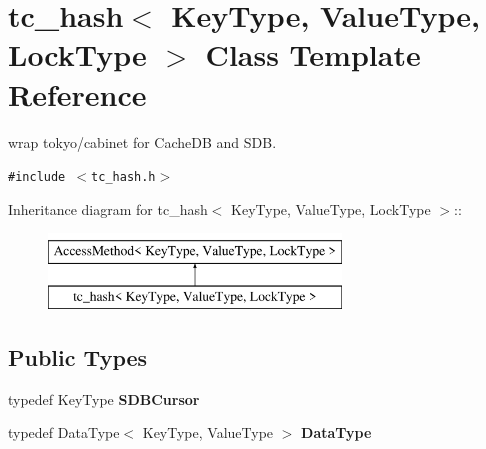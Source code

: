 \hypertarget{classtc__hash}{
\section{tc\_\-hash$<$ KeyType, ValueType, LockType $>$ Class Template Reference}
\label{classtc__hash}
}
wrap tokyo/cabinet for CacheDB and SDB.  


{\tt \#include $<$tc\_\-hash.h$>$}

Inheritance diagram for tc\_\-hash$<$ KeyType, ValueType, LockType $>$::\begin{figure}[H]
\begin{center}
\leavevmode
\includegraphics[height=2cm]{classtc__hash}
\end{center}
\end{figure}
\subsection*{Public Types}
\begin{CompactItemize}
\item 
\hypertarget{classtc__hash_372762dbf429e556715eb2893f395ac4}{
typedef KeyType \textbf{SDBCursor}}
\label{classtc__hash_372762dbf429e556715eb2893f395ac4}

\item 
\hypertarget{classtc__hash_f7211ed16f32c7b57b6ba567ae141eed}{
typedef DataType$<$ KeyType, ValueType $>$ \textbf{DataType}}
\label{classtc__hash_f7211ed16f32c7b57b6ba567ae141eed}

\end{CompactItemize}
